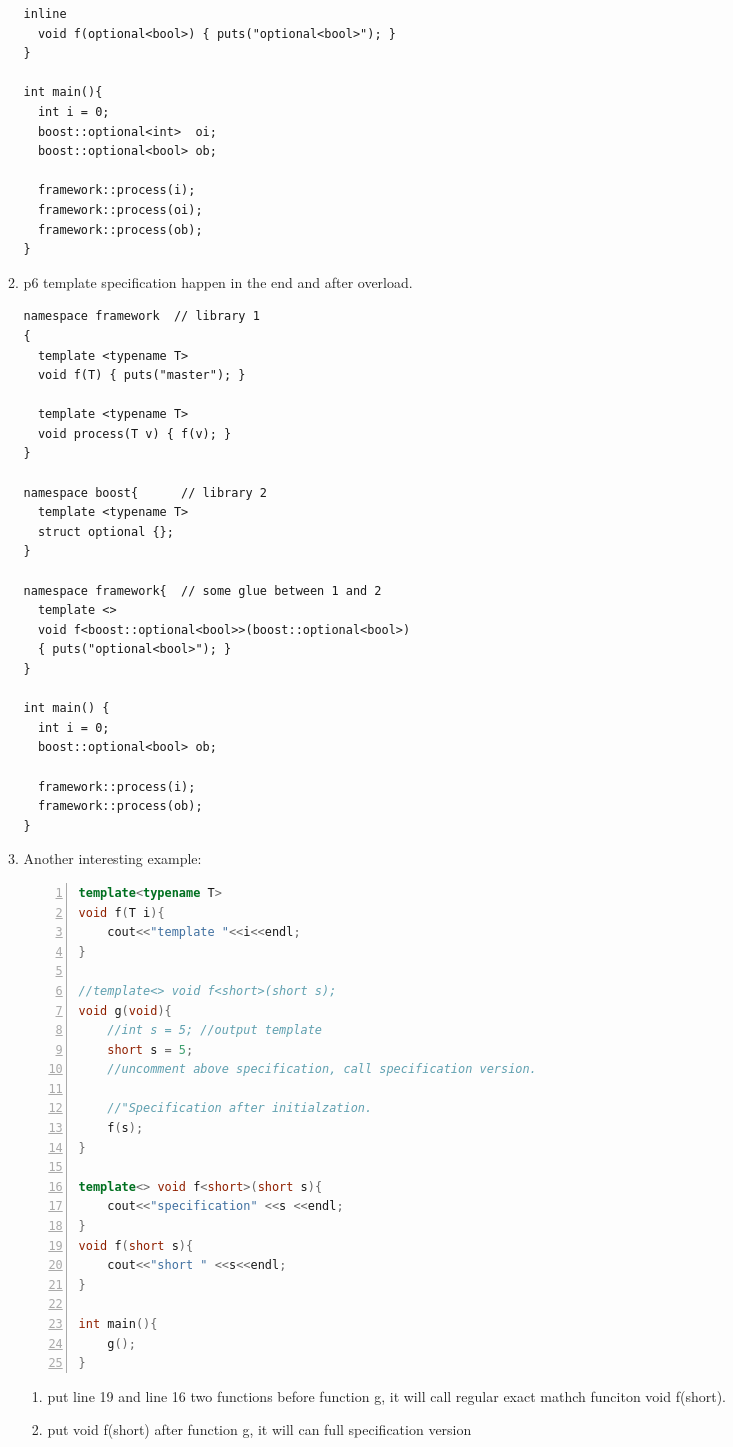 \documentclass[a4paper,11pt,twoside]{book}
\begin{document}
\begin{itemize}
\begin{enumerate}
\begin{lstlisting}[numbers=none]
  inline
  void f(optional<bool>) { puts("optional<bool>"); }
}
 
int main(){
  int i = 0;
  boost::optional<int>  oi;
  boost::optional<bool> ob;
  
  framework::process(i);
  framework::process(oi);
  framework::process(ob);
}
\end{lstlisting}

\item p6 template specification happen in the end and after overload. 
\begin{lstlisting}[numbers=none]
namespace framework  // library 1
{
  template <typename T>
  void f(T) { puts("master"); }
 
  template <typename T>
  void process(T v) { f(v); } 
}
 
namespace boost{      // library 2
  template <typename T>
  struct optional {};
}
 
namespace framework{  // some glue between 1 and 2
  template <>
  void f<boost::optional<bool>>(boost::optional<bool>)
  { puts("optional<bool>"); }
}
 
int main() {
  int i = 0;
  boost::optional<bool> ob;
  
  framework::process(i);
  framework::process(ob);
}
\end{lstlisting}

\item Another interesting example:
\begin{lstlisting}[frame=single, language=c++, numbers=left,
stepnumber=1,]
template<typename T>
void f(T i){
	cout<<"template "<<i<<endl;
}

//template<> void f<short>(short s);
void g(void){
	//int s = 5; //output template
	short s = 5; 
	//uncomment above specification, call specification version.

	//"Specification after initialzation.
	f(s);
}

template<> void f<short>(short s){
	cout<<"specification" <<s <<endl;
}
void f(short s){
	cout<<"short " <<s<<endl;
}

int main(){
	g();
}
\end{lstlisting}


\begin{enumerate}
	\item put line 19 and line 16 two  functions before function g, it will call regular exact mathch funciton void f(short). 
	
	\item put void f(short) after function g, it will can full specification version
	

\end{enumerate}
\end{enumerate}
\end{itemize}
\end{document}
